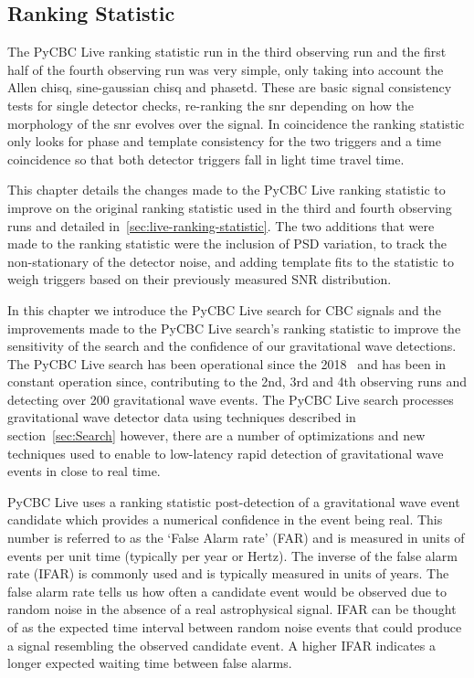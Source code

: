 \subsection{\label{sec:live-ranking-statistic}Ranking Statistic}

The PyCBC Live ranking statistic run in the third observing run and the first half of the fourth observing run was very simple, only taking into account the Allen chisq, sine-gaussian chisq and phasetd. These are basic signal consistency tests for single detector checks, re-ranking the snr depending on how the morphology of the snr evolves over the signal. In coincidence the ranking statistic only looks for phase and template consistency for the two triggers and a time coincidence so that both detector triggers fall in light time travel time.



This chapter details the changes made to the PyCBC Live ranking statistic to improve on the original ranking statistic used in the third and fourth observing runs and detailed in~\ref{sec:live-ranking-statistic}. The two additions that were made to the ranking statistic were the inclusion of PSD variation, to track the non-stationary of the detector noise, and adding template fits to the statistic to weigh triggers based on their previously measured SNR distribution.

In this chapter we introduce the PyCBC Live search for CBC signals and the improvements made to the PyCBC Live search's ranking statistic to improve the sensitivity of the search and the confidence of our gravitational wave detections. The PyCBC Live search has been operational since the 2018~\cite{PyCBC_live} and has been in constant operation since, contributing to the 2nd, 3rd and 4th observing runs and detecting over 200 gravitational wave events. The PyCBC Live search processes gravitational wave detector data using techniques described in section~\ref{sec:Search} however, there are a number of optimizations and new techniques used to enable to low-latency rapid detection of gravitational wave events in close to real time.

PyCBC Live uses a ranking statistic post-detection of a gravitational wave event candidate which provides a numerical confidence in the event being real. This number is referred to as the `False Alarm rate' (FAR) and is measured in units of events per unit time (typically per year or Hertz). The inverse of the false alarm rate (IFAR) is commonly used and is typically measured in units of years. The false alarm rate tells us how often a candidate event would be observed due to random noise in the absence of a real astrophysical signal. IFAR can be thought of as the expected time interval between random noise events that could produce a signal resembling the observed candidate event. A higher IFAR indicates a longer expected waiting time between false alarms.

